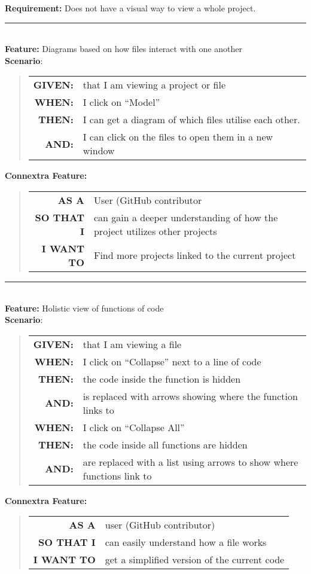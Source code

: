 \documentclass[12pt]{article}
\newcommand{\Requirement}[1] {
   \noindent \textbf{Requirement:} #1
}
\newcommand{\Feature}[1]{ 
   \noindent \textbf{Feature:} #1
}
\newcommand{\CFeature}[4]{
\noindent \textbf{Connextra Feature:}
	\begin{quote}
	\begin{tabular}{rl}
	\textbf{AS A} & #1\\
	\textbf{SO THAT \uppercase{#2}} & #3\\
	\textbf{\uppercase{#2} WANT TO} & #4  
	\end{tabular}
	\end{quote}
}
\newcommand{\GivenSc} {
	\noindent \textbf{GIVEN:}
	}
\newcommand{\WhenSc} {
	\noindent \textbf{WHEN:}
	}
\newcommand{\AndSc} {
	\noindent \textbf{AND:}
	}
\newcommand{\ThenSc} {
	\noindent \textbf{THEN:}
	}
\begin{document}
\begin{framed}
\Requirement{Does not have a visual way to view a whole project.}\\[0.2cm]

\hrule~\\

\Feature{Diagrams based on how files interact with one another}\\[0.2cm]

\noindent \textbf{Scenario}:
\begin{quote}
\begin{tabular}{rl}
\GivenSc & that I am viewing a project or file\\
\WhenSc & I click on ``Model''\\
\ThenSc & I can get a diagram of which files utilise each other.\\
\AndSc & I can click on the files to open them in a new window
\end{tabular}
\end{quote}

\CFeature{User (\textsf{GitHub} contributor}{I}{can gain a deeper understanding of how the project utilizes other projects}{Find more projects linked to the current project}

\hrule~\\

\Feature{Holistic view of functions of code}\\[0.4cm]

\noindent \textbf{Scenario}:
\begin{quote}
\begin{tabular}{rl}
\GivenSc & that I am viewing a file\\
\WhenSc & I click on “Collapse” next to a line of code\\
\ThenSc & the code inside the function is hidden\\
\AndSc & is replaced with arrows showing where the function links to\\
\WhenSc & I click on “Collapse All”\\
\ThenSc & the code inside all functions are hidden\\
\AndSc & are replaced with a list using arrows to show where functions link to\\
\end{tabular}
\end{quote}

\CFeature{user (\textsf{GitHub} contributor)}{I}{can easily understand how a file works}{get a simplified version of the current code}
\
\end{framed}
\end{document}
